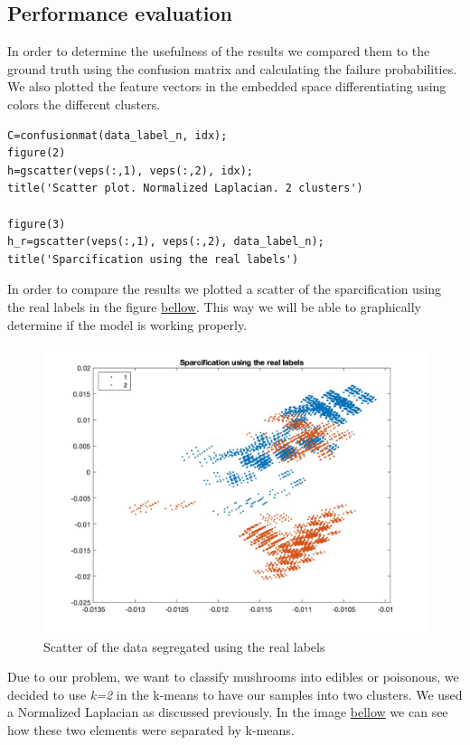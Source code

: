 \documentclass[12pt]{article}
\begin{document}
\subsection{Performance evaluation}
\justifying
In order to determine the usefulness of the results we compared them to the ground truth using the confusion matrix and calculating the failure probabilities. We also plotted the feature vectors in the embedded space differentiating using colors the different clusters.
\smallskip
\begin{lstlisting}
C=confusionmat(data_label_n, idx);
figure(2)
h=gscatter(veps(:,1), veps(:,2), idx);
title('Scatter plot. Normalized Laplacian. 2 clusters')

figure(3)
h_r=gscatter(veps(:,1), veps(:,2), data_label_n);
title('Sparcification using the real labels')
\end{lstlisting}

\smallskip
\justifying
In order to compare the results we plotted a scatter of the sparcification using the real labels in the figure \href{fig:scatterOriginalLabels}{bellow}. This way we will be able to graphically determine if the model is working properly.

\begin{figure}[H]
	\centering
	\includegraphics[width=12cm]{3.jpg}
	\caption{Scatter of the data segregated using the real labels}
	\label{fig:scatterOriginalLabels}
\end{figure}


\smallskip
\justifying
Due to our problem, we want to classify mushrooms into edibles or poisonous, we decided to use \emph{k=2} in the k-means to have our samples into two clusters. We used a Normalized Laplacian as discussed previously. In the image \href{fig:normLapl2clusters}{bellow} we can see how these two elements were separated by k-means.
\end{document}
